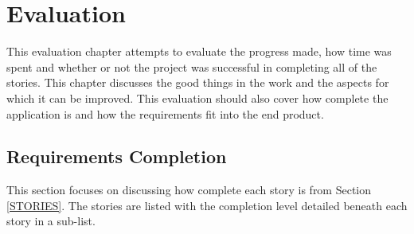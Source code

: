 \chapter{Evaluation}

This evaluation chapter attempts to evaluate the progress made, how time was spent and whether or not the project was successful in completing all of the stories. This chapter discusses the good things in the work and the aspects for which it can be improved. This evaluation should also cover how complete the application is and how the requirements fit into the end product.

\section{Requirements Completion}
This section focuses on discussing how complete each story is from Section \ref{STORIES}. The stories are listed with the completion level detailed beneath each story in a sub-list.

